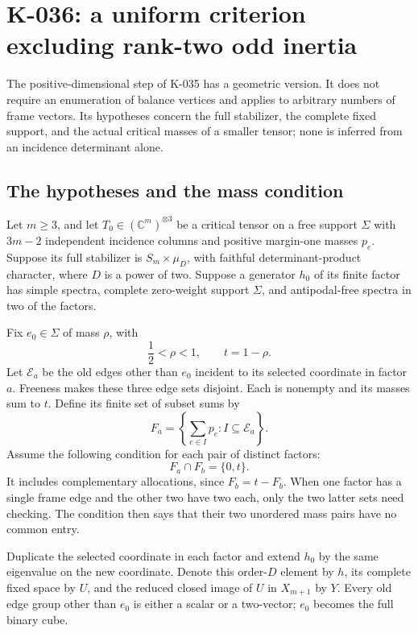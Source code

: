 \section{K-036: a uniform criterion excluding rank-two odd inertia}

The positive-dimensional step of K-035 has a geometric version.
It does not require an enumeration of balance vertices and applies
to arbitrary numbers of frame vectors.  Its hypotheses concern
the full stabilizer, the complete fixed support, and the actual
critical masses of a smaller tensor; none is inferred from an
incidence determinant alone.

\subsection*{The hypotheses and the mass condition}

Let $m\ge3$, and let $T_0\in(\mathbb C^m)^{\otimes3}$ be a critical tensor on a free
support $\Sigma$ with $3m-2$ independent incidence columns and
positive margin-one masses $p_e$.  Suppose its full stabilizer is
$S_m\times\mu_D$, with faithful determinant-product character,
where $D$ is a power of two.  Suppose a generator $h_0$ of its
finite factor has simple spectra, complete zero-weight support
$\Sigma$, and antipodal-free spectra in two of the factors.

Fix $e_0\in\Sigma$ of mass $\rho$, with
\[
                              \frac12<\rho<1,
                  \qquad t=1-\rho.                     \tag{K-036a}
\]
Let $\mathcal E_a$ be the old edges other than $e_0$ incident to
its selected coordinate in factor $a$.  Freeness makes these
three edge sets disjoint.  Each is nonempty and its masses sum
to $t$.  Define its finite set of subset sums by
\[
   F_a=\left\{\sum_{e\in I}p_e:I\subseteq\mathcal E_a\right\}.
\]
Assume the following condition for each pair of distinct factors:
\[
                             F_a\cap F_b=\{0,t\}.       \tag{K-036b}
\]
It includes complementary allocations, since $F_b=t-F_b$.
When one factor has a single frame edge and the other two have
two each, only the two latter sets need checking.  The condition
then says that their two unordered mass pairs have no common entry.

Duplicate the selected coordinate in each factor and extend
$h_0$ by the same eigenvalue on the new coordinate.  Denote this
order-$D$ element by $h$, its complete fixed space by $U$, and
the reduced closed image of $U$ in $X_{m+1}$ by $Y$.
Every old edge group other than $e_0$ is either a scalar or a
two-vector; $e_0$ becomes the full binary cube.


